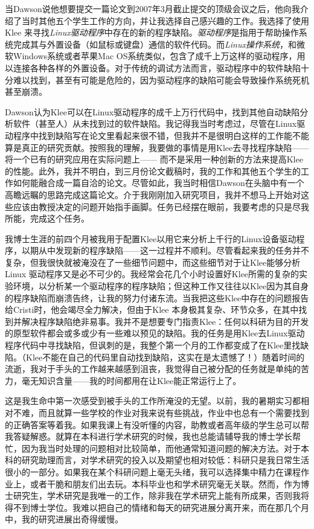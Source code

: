 \documentclass[letter,12pt]{book}
\begin{document}
\begin{CJK}{UTF8}{gbsn}
\breakline

当Dawson说他想要提交一篇论文到2007年3月截止提交的顶级会议之后，他向我介绍了当时其他五个学生工作的方向，并让我选择自己感兴趣的工作。我选择了使用Klee 来寻找\emph{Linux驱动程序}中存在的新的程序缺陷。\emph{驱动程序}是指用于帮助操作系统完成其与外置设备（如鼠标或键盘）通信的软件代码。而\emph{Linux操作系统}，和微软Windows系统或者苹果Mac OS系统类似，包含了成千上万这样的驱动程序，用以连接各种各样的外置设备。对于传统的调试方法而言，驱动程序中的软件缺陷十分难以找到，甚至有可能是危险的，因为驱动程序的缺陷可能会导致操作系统死机甚至崩溃。

Dawson认为Klee可以在Linux驱动程序的成千上万行代码中，找到其他自动缺陷分析软件（甚至人）从未找到过的软件缺陷。我记得我当时考虑过，尽管在Linux驱动程序中找到缺陷写在论文里看起来很不错，但我并不是很明白这样的工作能不能算是真正的研究贡献。按照我的理解，我要做的事情是用Klee去寻找程序缺陷—— 将一个已有的研究应用在实际问题上—— 而不是采用一种创新的方法来提高Klee的性能。此外，我并不明白，到三月份论文截稿时，我的工作和其他五个学生的工作如何能融合成一篇自洽的论文。尽管如此，我当时相信Dawson在头脑中有一个高瞻远瞩的思路完成这篇论文。介于我刚刚加入研究项目，我并不想马上开始对这些应该由教授决定的问题开始指手画脚。任务已经摆在眼前，我要考虑的只是尽我所能，完成这个任务。

\breakline

我博士生涯的前四个月被我用于配置Klee以用它来分析上千行的Linux设备驱动程序，以期从中发现新的程序缺陷——这一过程并不顺利。尽管看起来我的任务并不复杂，但我很快就被淹没在了一些细节问题中，而这些细节对于让Klee能够分析Linux 驱动程序又是必不可少的。我经常会花几个小时设置好Klee所需的复杂的实验环境，以分析某一个驱动程序的程序缺陷；但这种工作又往往以Klee因为其自身的程序缺陷而崩溃告终，让我的努力付诸东流。当我把这些Klee中存在的问题报告给Cristi时，他会竭尽全力解决，但由于Klee 本身极其复杂、环节众多，在其中找到并解决程序缺陷绝非易事。我并不是想要专门指责Klee：任何以科研为目的开发的原型软件都会或多或少有一些难以预见的缺陷。我的任务是用Klee去Linux驱动程序代码中寻找缺陷，但讽刺的是，我整个第一个月的工作都变成了在Klee里找缺陷。（Klee不能在自己的代码里自动找到缺陷，这实在是太遗憾了！）随着时间的流逝，我对于手头的工作越来越感到沮丧，我觉得自己被分配的任务就是单纯的苦力，毫无知识含量——我的时间都用在让Klee能正常运行上了。

这是我生命中第一次感受到被手头的工作所淹没的无望。以前，我的暑期实习都相对不难，而且就算一些学校的作业对我来说有些挑战，作业中也总有一个需要找到的正确答案等着我。如果我课上有没听懂的内容，助教或者高年级的学生总可以帮我答疑解惑。就算在本科进行学术研究的时候，我也总能请辅导我的博士学长帮忙，因为我当时处理的问题相对比较简单，而他通常知道问题的解决方法。对于本科的研究助理而言，对学术研究的投入以及期望也相对较低：科研只是我日常生活很小的一部分。如果我在某个科研问题上毫无头绪，我可以选择集中精力在课程作业上，或者干脆和朋友们出去玩。本科毕业也和学术研究毫无关联。然而，作为博士研究生，学术研究是我唯一的工作，除非我在学术研究上能有所成果，否则我将得不到博士学位。我难以把自己的情绪和每天的研究进展分离开来，而在那几个月中，我的研究进展出奇得缓慢。


\end{CJK}
\end{document}
